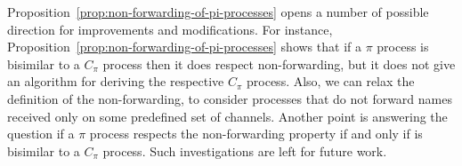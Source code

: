 Proposition~\ref{prop:non-forwarding-of-pi-processes} opens a number of possible direction for improvements and modifications.
For instance, Proposition~\ref{prop:non-forwarding-of-pi-processes} shows that if a $\pi$ process  is bisimilar to a $C_\pi$ process then it does respect non-forwarding, but it does not give an algorithm for deriving the respective $C_\pi$ process. 
Also, we can relax the definition of the non-forwarding, to consider processes that do not forward names received only on some predefined set of channels. Another point is answering the question if a $\pi$ process respects the non-forwarding property if and only if is bisimilar to a $C_\pi$ process.  Such investigations are left for future work.




